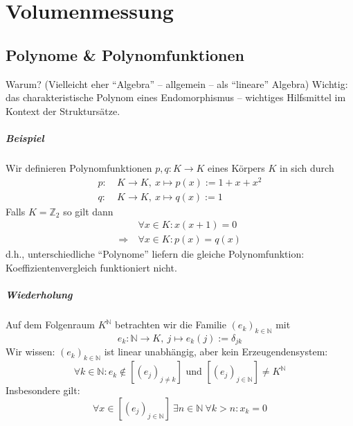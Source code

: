 \setcounter{chapter}{3}
\chapter{Volumenmessung}
\setcounter{section}{2}
\section{Polynome \& Polynomfunktionen}
	Warum? (Vielleicht eher "`Algebra"' -- allgemein -- als "`lineare"' Algebra) Wichtig: das charakteristische Polynom eines Endomorphismus -- wichtiges Hilfsmittel im Kontext der Struktursätze.
\paragraph{Beispiel}
	Wir definieren Polynomfunktionen $ p,q: K\to K $ eines Körpers $ K $ in sich durch 
		\begin{align*}
		p:\ & K\to K,\ x\mapsto p(x):= 1+x+x^2\\
		q:\ & K\to K,\ x\mapsto q(x):= 1
		\end{align*}
	Falls $ K=\mathbb{Z}_2 $ so gilt dann
		\begin{align*}
		&\forall x\in K: x(x+1)=0\\
		\Rightarrow\ &\forall x\in K: p(x) = q(x)
		\end{align*}
	d.h., unterschiedliche "`Polynome"' liefern die gleiche Polynomfunktion: Koeffizientenvergleich funktioniert nicht.
\paragraph{Wiederholung}
	Auf dem Folgenraum $ K^\mathbb{N} $ betrachten wir die Familie $ (e_k)_{k\in \mathbb{N}} $ mit
		\[ e_k :\mathbb{N}\to K,\ j\mapsto e_k(j):= \delta_{jk} \]
	Wir wissen: $ (e_k)_{k\in \mathbb{N}} $ ist linear unabhängig, aber kein Erzeugendensystem:
		\[ \forall k\in \mathbb{N}: e_k \notin [(e_j)_{j\neq k}] \text{ und }
		[(e_j)_{j\in\mathbb{N}}]\neq K^{\mathbb{N}}\]
	Insbesondere gilt:
		\[ \forall x\in [(e_j)_{j\in \mathbb{N}}]\ \exists n\in \mathbb{N}\ \forall k>n : x_k = 0 \]
